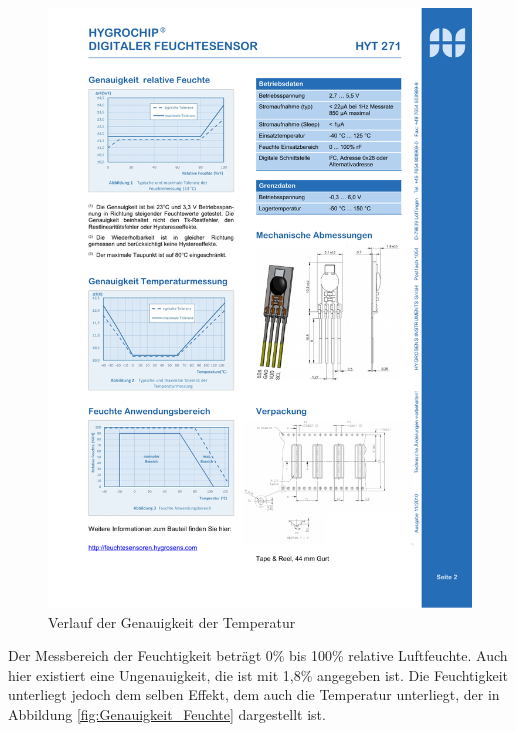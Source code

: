 				\begin{figure}[H]
					\centering
					\includegraphics{./Grafiken/GenauigkeitTemp}
					\caption[Verlauf der Genauigkeit der Temperatur]{Verlauf der Genauigkeit der Temperatur\protect\footnotemark}
					\label{fig:Genauigkeit_Temp}
				\end{figure}
				
				Der Messbereich der Feuchtigkeit beträgt 0\% bis 100\% relative Luftfeuchte. Auch hier existiert eine Ungenauigkeit, die ist mit 1,8\% angegeben ist. Die Feuchtigkeit unterliegt jedoch dem selben Effekt, dem auch die Temperatur unterliegt, der in Abbildung \ref{fig:Genauigkeit_Feuchte} dargestellt ist.
				
